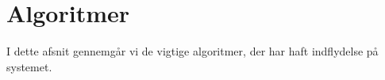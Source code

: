 \section{Algoritmer}
\label{sec:algoritmer}
I dette afsnit gennemgår vi de vigtige algoritmer, der har haft indflydelse på systemet.

 	